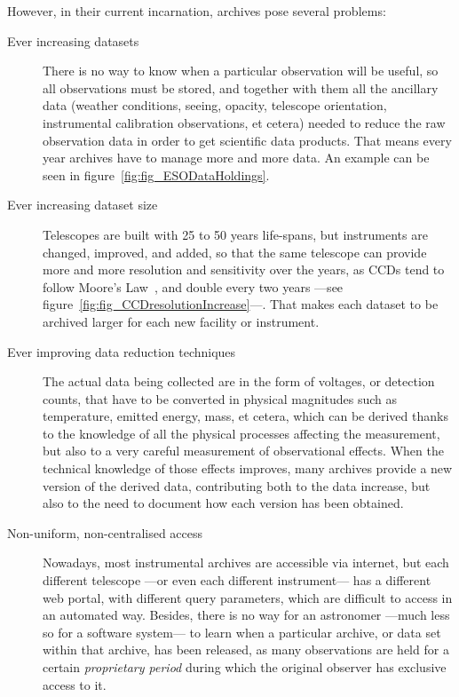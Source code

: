 	However, in their current incarnation, archives pose several 
	problems:

	\begin{description}
		\item[Ever increasing datasets] There is no way to know when
		a particular observation will be useful, so all observations
		must be stored, and together with them all the ancillary
		data (weather conditions, seeing, opacity, telescope
		orientation, instrumental calibration observations, et
		cetera) needed to reduce the raw observation data in order
		to get scientific data products. That means every year
		archives have to manage more and more data. An example can
		be seen in figure~\ref{fig:fig_ESODataHoldings}.
		
		 \item[Ever increasing dataset size] Telescopes are built
		with 25 to 50 years life-spans, but instruments are changed,
		improved, and added, so that the same telescope can provide
		more and more resolution and sensitivity over the years, as
		CCDs tend to follow Moore's Law~\cite{1965E......38.....M},
		and double every two years ---see
		figure~\ref{fig:fig_CCDresolutionIncrease}---. That makes
		each dataset to be archived larger for each new facility or
		instrument.
		
		 \item[Ever improving data reduction techniques] The actual
		data being collected are in the form of voltages, or
		detection counts, that have to be converted in physical
		magnitudes such as temperature, emitted energy, mass, et
		cetera, which can be derived thanks to the knowledge of all
		the physical processes affecting the measurement, but also
		to a very careful measurement of observational effects. When
		the technical knowledge of those effects improves, many
		archives provide a new version of the derived data,
		contributing both to the data increase, but also to the need
		to document how each version has been obtained.
		
		 \item[Non-uniform, non-centralised access] Nowadays, most
		instrumental archives are accessible via internet, but each
		different telescope ---or even each different instrument---
		has a different web portal, with different query parameters,
		which are difficult to access in an automated way. Besides,
		there is no way for an astronomer ---much less so for a
		software system--- to learn when a particular archive, or
		data set within that archive, has been released, as many
		observations are held for a certain \emph{proprietary
		period} during which the original observer has exclusive
		access to it.
	\end{description}


